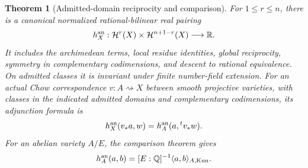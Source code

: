 \documentclass[11pt,a4paper]{article}
\newtheorem{theorem}{Theorem}[section]
\theoremstyle{definition}
\theoremstyle{remark}\newtheorem{remark}[theorem]{Remark}
\numberwithin{equation}{section}
\newcommand{\Q}{\mathbb Q}\newcommand{\R}{\mathbb R}\newcommand{\C}{\mathbb C}
\begin{document}
\begin{theorem}[Admitted-domain reciprocity and comparison]\label{hyp:height-input}
For $1\le r\le n$, there is a canonical normalized rational-bilinear real pairing
\[
 h_X^{\an}:\mathcal H^r(X)\times\mathcal H^{n+1-r}(X)\longrightarrow\R.
\]
It includes the archimedean terms, local residue identities, global
reciprocity, symmetry in complementary codimensions, and descent to rational equivalence. On admitted classes
it is invariant under finite number-field extension. For an actual
Chow correspondence $v:A\rightsquigarrow X$ between smooth projective
varieties, with classes in the indicated admitted domains and
complementary codimensions, its adjunction formula is
\begin{equation}\label{eq:height-adjunction}
       h_X^{\mathrm{an}}(v_*a,w)=h_A^{\mathrm{an}}(a,{}^tv_*w).
\end{equation}
For an abelian variety $A/E$, the comparison theorem gives
\begin{equation}\label{eq:abelian-comparison}
       h_A^{\an}(a,b)=[E:\Q]^{-1}\langle a,b\rangle_{A,\mathrm{Kun}}.
\end{equation}
\end{theorem}
\end{document}

